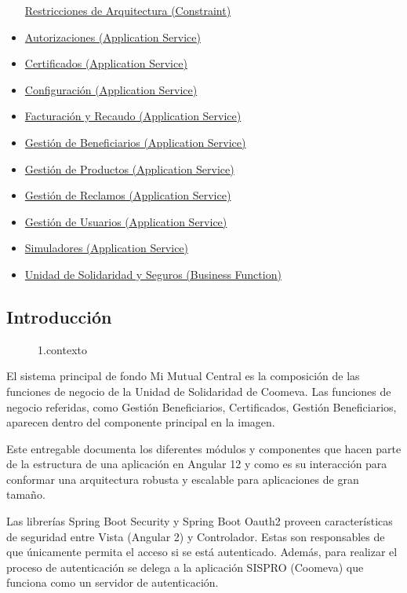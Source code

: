 \documentclass[
  paper=a4,
  ,captions=tableheading
]{scrartcl}
\begin{document}
\begin{itemize}
  \protect\hyperlink{restricciones-de-arquitectura-constraint}{Restricciones
  de Arquitectura (Constraint)}
\item
  \protect\hyperlink{autorizaciones-application-service}{Autorizaciones
  (Application Service)}
\item
  \protect\hyperlink{certificados-application-service}{Certificados
  (Application Service)}
\item
  \protect\hyperlink{configuraciuxf3n-application-service}{Configuración
  (Application Service)}
\item
  \protect\hyperlink{facturaciuxf3n-y-recaudo-application-service}{Facturación
  y Recaudo (Application Service)}
\item
  \protect\hyperlink{gestiuxf3n-de-beneficiarios-application-service}{Gestión
  de Beneficiarios (Application Service)}
\item
  \protect\hyperlink{gestiuxf3n-de-productos-application-service}{Gestión
  de Productos (Application Service)}
\item
  \protect\hyperlink{gestiuxf3n-de-reclamos-application-service}{Gestión
  de Reclamos (Application Service)}
\item
  \protect\hyperlink{gestiuxf3n-de-usuarios-application-service}{Gestión
  de Usuarios (Application Service)}
\item
  \protect\hyperlink{simuladores-application-service}{Simuladores
  (Application Service)}
\item
  \protect\hyperlink{unidad-de-solidaridad-y-seguros-business-function}{Unidad
  de Solidaridad y Seguros (Business Function)}
\end{itemize}

\hypertarget{introducciuxf3n-1}{%
\subsection{Introducción}\label{introducciuxf3n-1}}

\begin{figure}
\centering
\caption{1.contexto}
\end{figure}

El sistema principal de fondo Mi Mutual Central es la composición de las
funciones de negocio de la Unidad de Solidaridad de Coomeva. Las
funciones de negocio referidas, como Gestión Beneficiarios,
Certificados, Gestión Beneficiarios, aparecen dentro del componente
principal en la imagen.

Este entregable documenta los diferentes módulos y componentes que hacen
parte de la estructura de una aplicación en Angular 12 y como es su
interacción para conformar una arquitectura robusta y escalable para
aplicaciones de gran tamaño.

Las librerías Spring Boot Security y Spring Boot Oauth2 proveen
características de seguridad entre Vista (Angular 2) y Controlador.
Estas son responsables de que únicamente permita el acceso si se está
autenticado. Además, para realizar el proceso de autenticación se delega
a la aplicación SISPRO (Coomeva) que funciona como un servidor de
autenticación.
\end{document}
